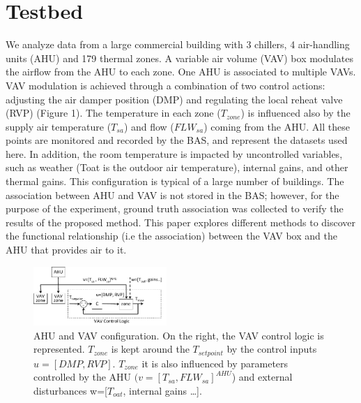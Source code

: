 \section{Testbed}

We analyze data from a large commercial building with 3 chillers, 4 air-handling units (AHU) and 179 thermal zones. A variable air volume (VAV) box modulates the airflow from the AHU to each zone. One AHU is associated to multiple VAVs. VAV modulation is achieved through a combination of two control actions: adjusting the air damper position (DMP) and regulating the local reheat valve (RVP) (Figure 1). The temperature in each zone ($T_{zone}$) is influenced also by the supply air temperature ($T_{sa}$) and flow ($FLW_{sa}$) coming from the AHU. All these points are monitored and recorded by the BAS, and represent the datasets used here. In addition, the room temperature is impacted by uncontrolled variables, such as weather (Toat is the outdoor air temperature), internal gains, and other thermal gains. This configuration is typical of a large number of buildings. The association between AHU and VAV is not stored in the BAS; however, for the purpose of the experiment, ground truth association was collected to verify the results of the proposed method. This paper explores different methods to discover the functional relationship (i.e the association) between the VAV box and the AHU that provides air to it.
 
 \begin{figure}[h!]

\centering
                \includegraphics[width=0.45\textwidth]{./figs/ahudiagram.pdf}
                \caption{AHU and VAV configuration. On the right, the VAV control logic is represented. $T_{zone}$ is kept around the $T_{setpoint}$ by the control inputs $u=[DMP, RVP]$. $T_{zone}$ it is also influenced by parameters controlled by the AHU $(v=[T_{sa}, FLW_{sa}]^{AHU}$)  and external disturbances w=[$T_{oat}$, internal gains …].}
                \label{fig:ahudiagram}
\end{figure}
